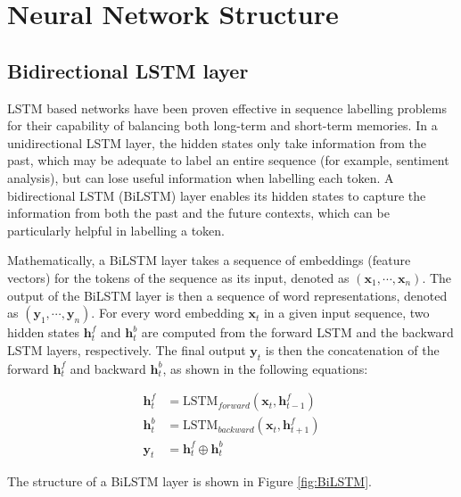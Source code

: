 \documentclass[11pt,a4paper]{article}
\begin{document}
\section{Neural Network Structure}

\subsection{Bidirectional LSTM layer}

LSTM based networks have been proven effective in sequence labelling problems for their capability of balancing both long-term and short-term memories. In a unidirectional LSTM layer, the hidden states only take information from the past, which may be adequate to label an entire sequence (for example, sentiment analysis), but can lose useful information when labelling each token. A bidirectional LSTM (BiLSTM) layer enables its hidden states to capture the information from both the past and the future contexts, which can be particularly helpful in labelling a token. 

Mathematically, a BiLSTM layer takes a sequence of embeddings (feature vectors) for the tokens of the sequence as its input, denoted as $(\bm{x}_1,\cdots,\bm{x}_n)$. The output of the BiLSTM layer is then a sequence of word representations, denoted as $(\bm{y}_1,\cdots,\bm{y}_n)$. For every word embedding $\bm{x}_t$ in a given input sequence, two hidden states $\bm{h}_t^f$ and $\bm{h}_t^b$ are computed from the forward LSTM and the backward LSTM layers, respectively. The final output $\bm{y}_t$ is then the concatenation of the forward $\bm{h}_t^f$ and backward $\bm{h}_t^b$, as shown in the following equations:

$$\begin{aligned}
    \bm{h}_t^f &= \text{LSTM}_\textit{forward}(\bm{x}_t, \bm{h}_{t-1}^f) \\
    \bm{h}_t^b &= \text{LSTM}_\textit{backward}(\bm{x}_t, \bm{h}_{t+1}^f) \\
    \bm{y}_t &= \bm{h}_t^f \oplus \bm{h}_t^b
\end{aligned}$$

The structure of a BiLSTM layer is shown in Figure \ref{fig:BiLSTM}.
\end{document}
